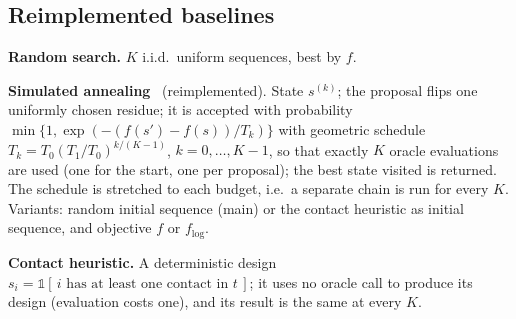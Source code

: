 \subsection{Reimplemented baselines}
\textbf{Random search.} $K$ i.i.d.\ uniform sequences, best by $f$.

\textbf{Simulated annealing}~\cite{kirkpatrick1983optimization} (reimplemented). State $s^{(k)}$; the proposal flips one uniformly chosen residue; it is accepted with probability $\min\{1,\exp(-(f(s')-f(s))/T_k)\}$ with geometric schedule $T_k=T_0(T_1/T_0)^{k/(K-1)}$, $k=0,\dots,K-1$, so that exactly $K$ oracle evaluations are used (one for the start, one per proposal); the best state visited is returned. The schedule is stretched to each budget, i.e.\ a separate chain is run for every $K$. Variants: random initial sequence (main) or the contact heuristic as initial sequence, and objective $f$ or $f_{\log}$.

\textbf{Contact heuristic.} A deterministic design $s_i=\mathbb{1}[\,i \text{ has at least one contact in } t\,]$; it uses no oracle call to produce its design (evaluation costs one), and its result is the same at every $K$.
